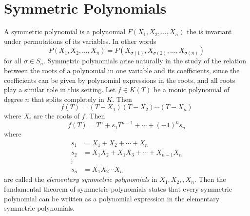 \documentclass{article}
\theoremstyle{remark}
\begin{document}
    \section{Symmetric Polynomials}
    A symmetric polynomial is a polynomial $F(X_1,X_2,\dots, X_n)$ the is invariant under permutations of its variables.
    In other words
    $$ P(X_1, X_2,\dots, X_n)=P(X_{\sigma(1)}, X_{\sigma(2)},\dots,X_{\sigma(n)})$$
    for all $\sigma\in S_n$.
    Symmetric polynomials arise naturally in the study of the relation between the roots of a polynomial in one variable and its coefficients, 
    since the coefficients can be given by polynomial expressions in the roots, and all roots play a similar role in this setting.
    Let $f\in K(T)$ be a monic polynomial of degree $n$ that splits completely in $K$.
    Then
    $$ f(T)=(T-X_1)(T-X_2)\cdots(T-X_n)$$
    where $X_i$ are the roots of $f$. Then
    $$ f(T)=T^n+s_1 T^{n-1}+\cdots+(-1)^n s_n$$
    where
    \begin{align*}
        s_1&=X_1+X_2+\cdots+X_n\\
        s_2&=X_1X_2+X_1X_3+\cdots+X_{n-1}X_n\\
        \vdots&\\
        s_n&=X_1X_2\cdots X_n
    \end{align*}
    are called the \textit{elementary symmetric polynomials} in $X_1,X_2,\dot, X_n$.
    Then the fundamental theorem of symmetric polynomials states that every symmetric polynomial can be written as a polynomial expression in the elementary symmetric polynomials.
\end{document}
